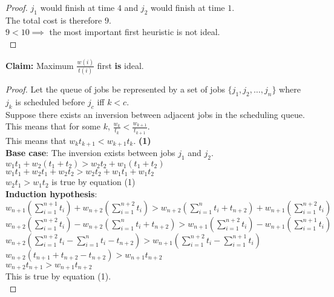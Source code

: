 \begin{problem}
\begin{proof}
    $j_1$ would finish at time $4$ and $j_2$ would finish at time $1$. \\
    The total cost is therefore $9$. \\
    $9 < 10 \implies$ the most important first heuristic is not ideal. \\
  \end{proof}
  \textbf{Claim:} Maximum $\frac{w(i)}{t(i)}$ first \textbf{is} ideal. \\
  \begin{proof}
      Let the queue of jobs be represented by a set of jobs $\{j_1, j_2, \dots, j_n\}$ where $j_k$ is scheduled before $j_c$ iff $k < c$. \\
      Suppose there exists an inversion between adjacent jobs in the scheduling queue. \\
      This means that for some $k$, $\frac{w_k}{t_k} < \frac{w_{k+1}}{t_{k+1}}$. \\
      This means that $w_kt_{k+1} < w_{k+1}t_k$. \hfill \textbf{(1)} \\
      \textbf{Base case}: The inversion exists between jobs $j_1$ and $j_2$. \\
      $w_1t_1 + w_2(t_1+t_2) > w_2t_2 + w_1(t_1 + t_2)$ \\
      $w_1t_1 + w_2t_1 + w_2t_2 > w_2t_2 + w_1t_1 + w_1t_2$ \\
      $w_2t_1 > w_1t_2$ is true by equation (1) \\
      \textbf{Induction hypothesis}: \\
      $w_{n+1}\left(\sum_{i = 1}^{n+1}t_i\right) + w_{n+2}\left(\sum_{i=1}^{n+2}t_i\right) > w_{n+2}\left(\sum_{i = 1}^{n}t_i + t_{n+2}\right) + w_{n+1}\left(\sum_{i = 1}^{n+2}t_i\right)$ \\
      $w_{n+2}\left(\sum_{i=1}^{n+2}t_i\right) - w_{n+2}\left(\sum_{i = 1}^{n}t_i + t_{n+2}\right) > w_{n+1}\left(\sum_{i = 1}^{n+2}t_i\right) - w_{n+1}\left(\sum_{i = 1}^{n+1}t_i\right) $ \\
      $w_{n+2}\left(\sum_{i = 1}^{n+2}t_i - \sum_{i = 1}^{n}t_i - t_{n+2}\right) > w_{n+1}\left(\sum_{i = 1}^{n+2}t_i - \sum_{i = 1}^{n+1}t_i\right)$ \\
      $w_{n+2}\left(t_{n+1} + t_{n+2} - t_{n+2}\right) > w_{n+1}t_{n+2}$ \\
      $w_{n+2}t_{n+1} > w_{n+1}t_{n+2}$ \\
      This is true by equation (1). \\
  \end{proof}
\end{problem}
